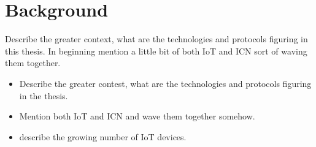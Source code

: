 \section{Background}

Describe the greater context, what are the technologies and protocols figuring in this thesis.
In beginning mention a little bit of both IoT and ICN sort of waving them together.

\begin{itemize}
\item Describe the greater contest, what are the technologies and protocols figuring in the thesis.
\item Mention both IoT and ICN and wave them together somehow.
\item describe the growing number of IoT devices.
\end{itemize}








%
